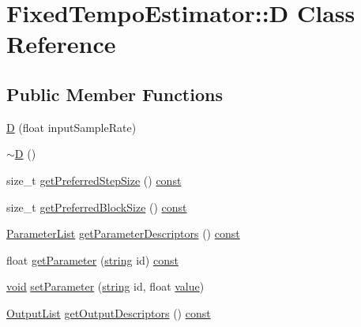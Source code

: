 \hypertarget{class_fixed_tempo_estimator_1_1_d}{}\section{Fixed\+Tempo\+Estimator\+:\+:D Class Reference}
\label{class_fixed_tempo_estimator_1_1_d}
\subsection*{Public Member Functions}
\begin{DoxyCompactItemize}
\item 
\hyperlink{class_fixed_tempo_estimator_1_1_d_a104a9b64d47eca678844584f69ca0b9d}{D} (float input\+Sample\+Rate)
\item 
\hyperlink{class_fixed_tempo_estimator_1_1_d_a78a63ac8bbf342cb0405747871adf4cc}{$\sim$D} ()
\item 
size\+\_\+t \hyperlink{class_fixed_tempo_estimator_1_1_d_add749be18355ab1ae5c1ccbacfd2e192}{get\+Preferred\+Step\+Size} () \hyperlink{getopt1_8c_a2c212835823e3c54a8ab6d95c652660e}{const} 
\item 
size\+\_\+t \hyperlink{class_fixed_tempo_estimator_1_1_d_ac02826f981736fc2aa5d835fa14e174d}{get\+Preferred\+Block\+Size} () \hyperlink{getopt1_8c_a2c212835823e3c54a8ab6d95c652660e}{const} 
\item 
\hyperlink{class_vamp_1_1_plugin_base_a3b6bb4bbd86affe1ca9deceea1aad4f8}{Parameter\+List} \hyperlink{class_fixed_tempo_estimator_1_1_d_a06fcf80a9a22c4b90abbc88eb592621a}{get\+Parameter\+Descriptors} () \hyperlink{getopt1_8c_a2c212835823e3c54a8ab6d95c652660e}{const} 
\item 
float \hyperlink{class_fixed_tempo_estimator_1_1_d_a968ef2e555c81e4a3bde89d19fafb31a}{get\+Parameter} (\hyperlink{test__lib_f_l_a_c_2format_8c_ab02026ad0de9fb6c1b4233deb0a00c75}{string} id) \hyperlink{getopt1_8c_a2c212835823e3c54a8ab6d95c652660e}{const} 
\item 
\hyperlink{sound_8c_ae35f5844602719cf66324f4de2a658b3}{void} \hyperlink{class_fixed_tempo_estimator_1_1_d_a6cafa64d4cc8aa3556bc0ce6b0c49bc4}{set\+Parameter} (\hyperlink{test__lib_f_l_a_c_2format_8c_ab02026ad0de9fb6c1b4233deb0a00c75}{string} id, float \hyperlink{lib_2expat_8h_a4a30a13b813682e68c5b689b45c65971}{value})
\item 
\hyperlink{class_vamp_1_1_plugin_a30f531b8fb69fac41a24e3d2a6a08ed9}{Output\+List} \hyperlink{class_fixed_tempo_estimator_1_1_d_a7ce98af800f36045a0dae4b1dbed943f}{get\+Output\+Descriptors} () \hyperlink{getopt1_8c_a2c212835823e3c54a8ab6d95c652660e}{const} 

\end{DoxyCompactItemize}
